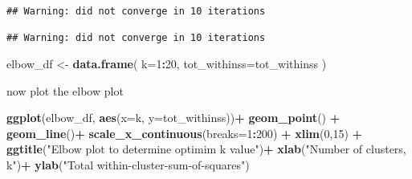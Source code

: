 \documentclass[]{article}
\newenvironment{Shaded}{\begin{snugshade}}{\end{snugshade}}
\newcommand{\KeywordTok}[1]{\textcolor[rgb]{0.13,0.29,0.53}{\textbf{#1}}}
\newcommand{\DataTypeTok}[1]{\textcolor[rgb]{0.13,0.29,0.53}{#1}}
\newcommand{\DecValTok}[1]{\textcolor[rgb]{0.00,0.00,0.81}{#1}}
\newcommand{\StringTok}[1]{\textcolor[rgb]{0.31,0.60,0.02}{#1}}
\newcommand{\ControlFlowTok}[1]{\textcolor[rgb]{0.13,0.29,0.53}{\textbf{#1}}}
\newcommand{\OperatorTok}[1]{\textcolor[rgb]{0.81,0.36,0.00}{\textbf{#1}}}
\newcommand{\NormalTok}[1]{#1}
\begin{document}
\begin{Shaded}
\end{Shaded}

\begin{verbatim}
## Warning: did not converge in 10 iterations

## Warning: did not converge in 10 iterations
\end{verbatim}

\begin{Shaded}
\begin{Highlighting}[]
\NormalTok{elbow_df <-}\StringTok{ }\KeywordTok{data.frame}\NormalTok{(}
  \DataTypeTok{k=}\DecValTok{1}\OperatorTok{:}\DecValTok{20}\NormalTok{,}
  \DataTypeTok{tot_withinss=}\NormalTok{tot_withinss}
\NormalTok{)}
\end{Highlighting}
\end{Shaded}

now plot the elbow plot

\begin{Shaded}
\begin{Highlighting}[]
\KeywordTok{ggplot}\NormalTok{(elbow_df, }\KeywordTok{aes}\NormalTok{(}\DataTypeTok{x=}\NormalTok{k, }\DataTypeTok{y=}\NormalTok{tot_withinss))}\OperatorTok{+}
\StringTok{  }\KeywordTok{geom_point}\NormalTok{() }\OperatorTok{+}
\StringTok{  }\KeywordTok{geom_line}\NormalTok{()}\OperatorTok{+}
\StringTok{  }\KeywordTok{scale_x_continuous}\NormalTok{(}\DataTypeTok{breaks=}\DecValTok{1}\OperatorTok{:}\DecValTok{200}\NormalTok{) }\OperatorTok{+}
\StringTok{  }\KeywordTok{xlim}\NormalTok{(}\DecValTok{0}\NormalTok{,}\DecValTok{15}\NormalTok{) }\OperatorTok{+}
\StringTok{  }\KeywordTok{ggtitle}\NormalTok{(}\StringTok{"Elbow plot to determine optimim k value"}\NormalTok{)}\OperatorTok{+}
\StringTok{  }\KeywordTok{xlab}\NormalTok{(}\StringTok{"Number of clusters, k"}\NormalTok{)}\OperatorTok{+}
\StringTok{  }\KeywordTok{ylab}\NormalTok{(}\StringTok{"Total within-cluster-sum-of-squares"}\NormalTok{)}
\end{Highlighting}
\end{Shaded}
\end{document}
